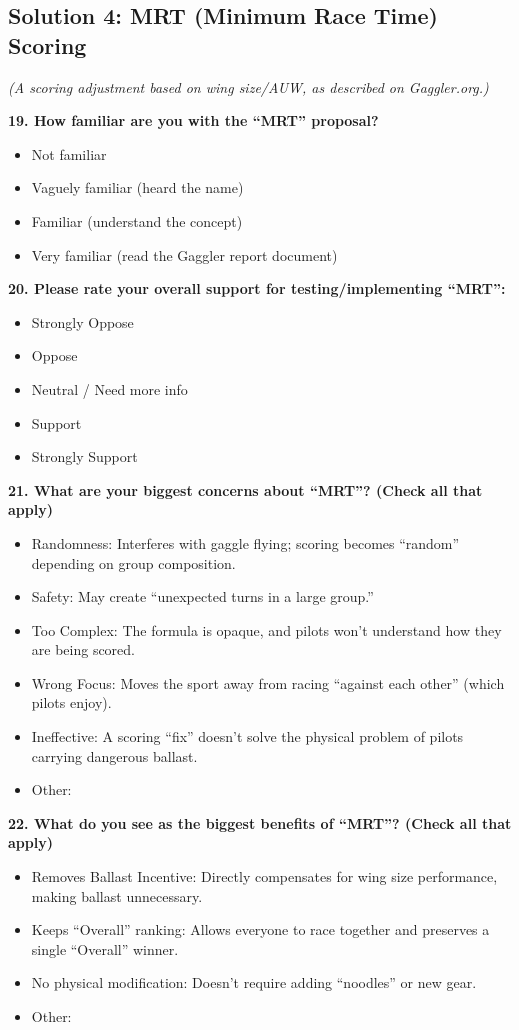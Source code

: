 \documentclass[11pt,a4paper]{article}
\begin{document}
\subsection{Solution 4: MRT (Minimum Race Time) Scoring}

\textit{(A scoring adjustment based on wing size/AUW, as described on Gaggler.org.)}

\textbf{19. How familiar are you with the ``MRT'' proposal?}
\begin{itemize}[label=$\square$]
    \item Not familiar
    \item Vaguely familiar (heard the name)
    \item Familiar (understand the concept)
    \item Very familiar (read the Gaggler report document)
\end{itemize}

\textbf{20. Please rate your overall support for testing/implementing ``MRT'':}
\begin{itemize}[label=$\square$]
    \item Strongly Oppose
    \item Oppose
    \item Neutral / Need more info
    \item Support
    \item Strongly Support
\end{itemize}

\textbf{21. What are your biggest concerns about ``MRT''? (Check all that apply)}
\begin{itemize}[label=$\square$]
    \item Randomness: Interferes with gaggle flying; scoring becomes ``random'' depending on group composition.
    \item Safety: May create ``unexpected turns in a large group.''
    \item Too Complex: The formula is opaque, and pilots won't understand how they are being scored.
    \item Wrong Focus: Moves the sport away from racing ``against each other'' (which pilots enjoy).
    \item Ineffective: A scoring ``fix'' doesn't solve the physical problem of pilots carrying dangerous ballast.
    \item Other: \underline{\hspace{3cm}}
\end{itemize}

\textbf{22. What do you see as the biggest benefits of ``MRT''? (Check all that apply)}
\begin{itemize}[label=$\square$]
    \item Removes Ballast Incentive: Directly compensates for wing size performance, making ballast unnecessary.
    \item Keeps ``Overall'' ranking: Allows everyone to race together and preserves a single ``Overall'' winner.
    \item No physical modification: Doesn't require adding ``noodles'' or new gear.
    \item Other: \underline{\hspace{3cm}}
\end{itemize}
\end{document}

